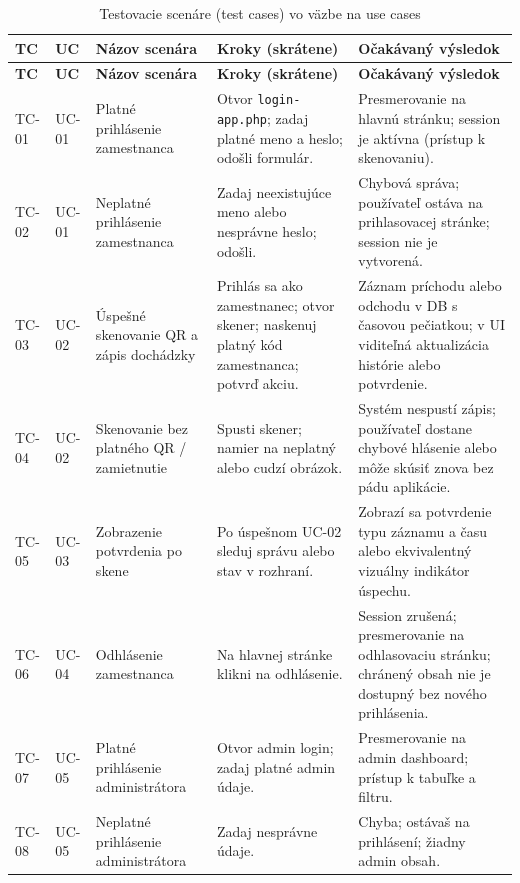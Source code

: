 \renewcommand{\arraystretch}{1.1}
\setlength{\tabcolsep}{3pt}
\footnotesize
\begin{longtable}{|p{1.0cm}|p{1.0cm}|p{3.0cm}|p{3.5cm}|p{4.8cm}|}
\caption{Testovacie scenáre (test cases) vo väzbe na use cases}\label{t:test-cases}\\
\hline
\textbf{TC} & \textbf{UC} & \textbf{Názov scenára} & \textbf{Kroky (skrátene)} & \textbf{Očakávaný výsledok} \\
\hline
\endfirsthead
\hline
\textbf{TC} & \textbf{UC} & \textbf{Názov scenára} & \textbf{Kroky (skrátene)} & \textbf{Očakávaný výsledok} \\
\hline
\endhead
TC-01 & UC-01 & Platné prihlásenie zamestnanca &
Otvor \texttt{login-app.php}; zadaj platné meno a heslo; odošli formulár. &
Presmerovanie na hlavnú stránku; session je aktívna (prístup k skenovaniu). \\
\hline
TC-02 & UC-01 & Neplatné prihlásenie zamestnanca &
Zadaj neexistujúce meno alebo nesprávne heslo; odošli. &
Chybová správa; používateľ ostáva na prihlasovacej stránke; session nie je vytvorená. \\
\hline
TC-03 & UC-02 & Úspešné skenovanie QR a zápis dochádzky &
Prihlás sa ako zamestnanec; otvor skener; naskenuj platný kód zamestnanca; potvrď akciu. &
Záznam príchodu alebo odchodu v DB s časovou pečiatkou; v UI viditeľná aktualizácia histórie alebo potvrdenie. \\
\hline
TC-04 & UC-02 & Skenovanie bez platného QR / zamietnutie &
Spusti skener; namier na neplatný alebo cudzí obrázok. &
Systém nespustí zápis; používateľ dostane chybové hlásenie alebo môže skúsiť znova bez pádu aplikácie. \\
\hline
TC-05 & UC-03 & Zobrazenie potvrdenia po skene &
Po úspešnom UC-02 sleduj správu alebo stav v rozhraní. &
Zobrazí sa potvrdenie typu záznamu a času alebo ekvivalentný vizuálny indikátor úspechu. \\
\hline
TC-06 & UC-04 & Odhlásenie zamestnanca &
Na hlavnej stránke klikni na odhlásenie. &
Session zrušená; presmerovanie na odhlasovaciu stránku; chránený obsah nie je dostupný bez nového prihlásenia. \\
\hline
TC-07 & UC-05 & Platné prihlásenie administrátora &
Otvor admin login; zadaj platné admin údaje. &
Presmerovanie na admin dashboard; prístup k tabuľke a filtru. \\
\hline
TC-08 & UC-05 & Neplatné prihlásenie administrátora &
Zadaj nesprávne údaje. &
Chyba; ostávaš na prihlásení; žiadny admin obsah. \\

\end{longtable}
